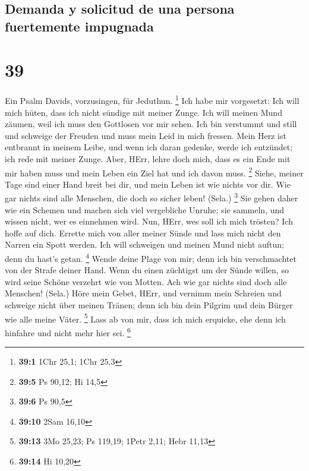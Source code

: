 \hypertarget{demanda-y-solicitud-de-una-persona-fuertemente-impugnada}{%
\subsection{Demanda y solicitud de una persona fuertemente
impugnada}\label{demanda-y-solicitud-de-una-persona-fuertemente-impugnada}}

\hypertarget{section-38}{%
\section{39}\label{section-38}}

 Ein Psalm Davids, vorzusingen, für Jeduthun. \footnote{\textbf{39:1}
  1Chr 25,1; 1Chr 25,3}  Ich habe mir vorgesetzt: Ich will
mich hüten, dass ich nicht sündige mit meiner Zunge. Ich will meinen
Mund zäumen, weil ich muss den Gottlosen vor mir sehen. 
Ich bin verstummt und still und schweige der Freuden und muss mein Leid
in mich fressen.  Mein Herz ist entbrannt in meinem Leibe,
und wenn ich daran gedenke, werde ich entzündet; ich rede mit meiner
Zunge.  Aber, HErr, lehre doch mich, dass es ein Ende mit
mir haben muss und mein Leben ein Ziel hat und ich davon muss.
\footnote{\textbf{39:5} Ps 90,12; Hi 14,5}  Siehe, meiner
Tage sind einer Hand breit bei dir, und mein Leben ist wie nichts vor
dir. Wie gar nichts sind alle Menschen, die doch so sicher leben!
(Sela.) \footnote{\textbf{39:6} Ps 90,5}  Sie gehen daher
wie ein Schemen und machen sich viel vergebliche Unruhe; sie sammeln,
und wissen nicht, wer es einnehmen wird.  Nun, HErr, wes
soll ich mich trösten? Ich hoffe auf dich.  Errette mich
von aller meiner Sünde und lass mich nicht den Narren ein Spott werden.
 Ich will schweigen und meinen Mund nicht auftun; denn du
hast's getan. \footnote{\textbf{39:10} 2Sam 16,10}  Wende
deine Plage von mir; denn ich bin verschmachtet von der Strafe deiner
Hand.  Wenn du einen züchtigst um der Sünde willen, so
wird seine Schöne verzehrt wie von Motten. Ach wie gar nichts sind doch
alle Menschen! (Sela.)  Höre mein Gebet, HErr, und
vernimm mein Schreien und schweige nicht über meinen Tränen; denn ich
bin dein Pilgrim und dein Bürger wie alle meine Väter. \footnote{\textbf{39:13}
  3Mo 25,23; Ps 119,19; 1Petr 2,11; Hebr 11,13}  Lass ab
von mir, dass ich mich erquicke, ehe denn ich hinfahre und nicht mehr
hier sei. \footnote{\textbf{39:14} Hi 10,20}

